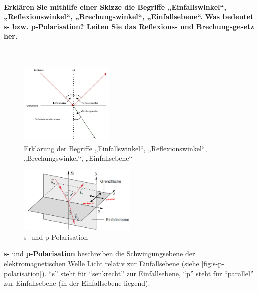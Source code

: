 \documentclass[a4paper, 11pt, ngerman, parskip=half-]{scrartcl}
\begin{document}
\paragraph{Erklären Sie mithilfe einer Skizze die Begriffe „Einfallswinkel“, „Reflexionswinkel“, „Brechungswinkel“,
    „Einfallsebene“. Was bedeutet s- bzw. p-Polarisation? Leiten Sie das Reflexions- und Brechungsgesetz her.}~
%
\begin{figure}[H]
    \centering
    \begin{samepage}
        \includegraphics[width=0.4\textwidth]{image/15/brechung_reflexion.pdf}
        \caption{Erklärung der Begriffe „Einfallswinkel“, „Reflexionswinkel“, „Brechungswinkel“, „Einfallsebene“}
        \label{fig:reflexion_brechung}
    \end{samepage}
\end{figure}
%
\begin{figure}[H]
    \centering
    \begin{samepage}
        \includegraphics[width=0.5\textwidth]{image/15/polarisationen.png}
        \caption{s- und p-Polarisation}
        \label{fig:s-p-polarisation}
    \end{samepage}
\end{figure}
%
\textbf{s-} und \textbf{p-Polarisation} beschreiben die Schwingungsebene der elektromagnetischen Welle Licht relativ
zur Einfallsebene (siehe \autoref{fig:s-p-polarisation}). \enquote{s} steht für \enquote{senkrecht} zur Einfallsebene,
\enquote{p} steht für \enquote{parallel} zur Einfallsebene (in der Einfallsebene liegend).
%
\end{document}
